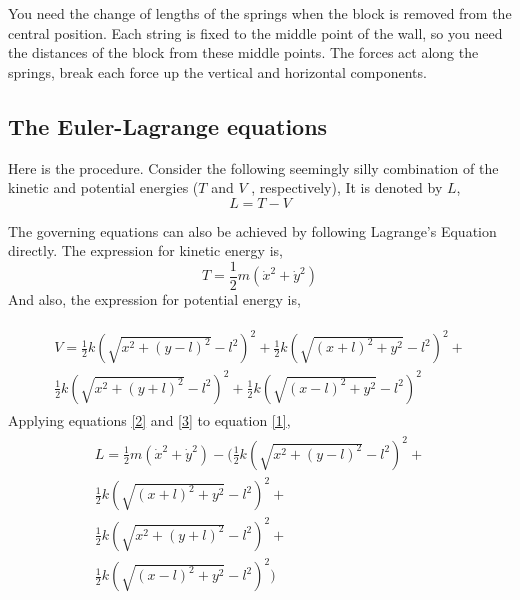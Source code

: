 \documentclass[extendedabs]{AAVL}
\begin{document}
You need the change of lengths of the springs when the block is removed from the central position. Each string is fixed to the middle point of the wall, so you need the distances of the block from these middle points. The forces act along the springs, break each force up the vertical and horizontal components. 

\subsection{The Euler-Lagrange equations}
\label{ab}
Here is the procedure. Consider the following seemingly silly combination of the kinetic and potential energies ($T$ and $V$ , respectively), It is denoted by $L$,
\begin{equation}
\label{1}
    L = T-V
\end{equation}

 The governing equations can also be achieved by following Lagrange's Equation directly. The expression for kinetic energy is,
\begin{equation}
\label{2}
    T = \frac{1}{2}m(\dot{x}^2 + \dot{y}^2)
\end{equation}
And also, the expression for potential energy is,

\begin{align}
\label{3}
\begin{split}
    V = \frac{1}{2}k(\sqrt{x^2+(y-l)^2}- l^2 )^2+ \frac{1}{2}k(\sqrt{(x+l)^2+y^2}- l^2 )^2 + \\ \frac{1}{2}k(\sqrt{x^2+(y+l)^2}- l^2 )^2   + \frac{1}{2}k(\sqrt{(x-l)^2+y^2}- l^2 )^2 
    \end{split}
\end{align}
Applying equations \eqref{2} and \eqref{3} to equation \eqref{1},
\begin{align}
\label{4}
    \begin{split}
        L = \frac{1}{2}m(\dot{x}^2 + \dot{y}^2) - \bigg ( \frac{1}{2}k(\sqrt{x^2+(y-l)^2}- l^2 )^2 + \\ \frac{1}{2}k(\sqrt{(x+l)^2+y^2}- l^2 )^2 + \\ \frac{1}{2}k(\sqrt{x^2+(y+l)^2}- l^2 )^2  + \\\frac{1}{2}k(\sqrt{(x-l)^2+y^2}- l^2 )^2 \bigg )
    \end{split}
\end{align}
\end{document}
